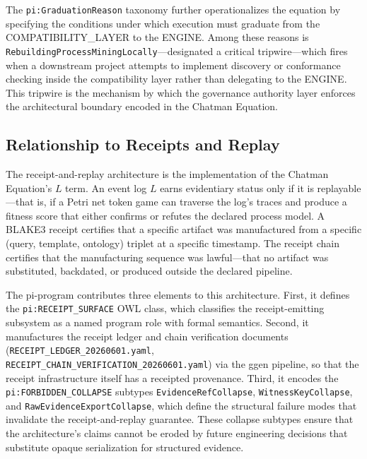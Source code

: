 The \texttt{pi:GraduationReason} taxonomy further operationalizes the equation by specifying the conditions under which execution must graduate from the COMPATIBILITY\_LAYER to the ENGINE. Among these reasons is \texttt{RebuildingProcessMiningLocally}---designated a critical tripwire---which fires when a downstream project attempts to implement discovery or conformance checking inside the compatibility layer rather than delegating to the ENGINE. This tripwire is the mechanism by which the governance authority layer enforces the architectural boundary encoded in the Chatman Equation.

\subsection{Relationship to Receipts and Replay}
\label{sec:research-pi-program-lineage-receipts}

The receipt-and-replay architecture is the implementation of the Chatman Equation's $L$ term. An event log $L$ earns evidentiary status only if it is replayable---that is, if a Petri net token game can traverse the log's traces and produce a fitness score that either confirms or refutes the declared process model. A BLAKE3 receipt certifies that a specific artifact was manufactured from a specific (query, template, ontology) triplet at a specific timestamp. The receipt chain certifies that the manufacturing sequence was lawful---that no artifact was substituted, backdated, or produced outside the declared pipeline.

The pi-program contributes three elements to this architecture. First, it defines the \texttt{pi:RECEIPT\_SURFACE} OWL class, which classifies the receipt-emitting subsystem as a named program role with formal semantics. Second, it manufactures the receipt ledger and chain verification documents (\texttt{RECEIPT\_LEDGER\_20260601.yaml}, \texttt{RECEIPT\_CHAIN\_VERIFICATION\_20260601.yaml}) via the ggen pipeline, so that the receipt infrastructure itself has a receipted provenance. Third, it encodes the \texttt{pi:FORBIDDEN\_COLLAPSE} subtypes \texttt{EvidenceRefCollapse}, \texttt{WitnessKeyCollapse}, and \texttt{RawEvidenceExportCollapse}, which define the structural failure modes that invalidate the receipt-and-replay guarantee. These collapse subtypes ensure that the architecture's claims cannot be eroded by future engineering decisions that substitute opaque serialization for structured evidence.
